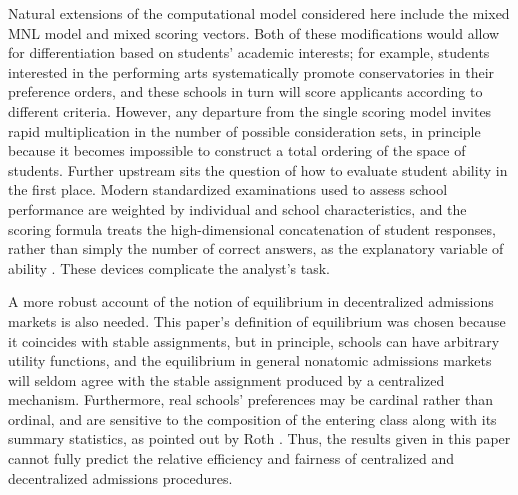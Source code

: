 \documentclass[12pt]{article}
\theoremstyle{definition}
\begin{document}
Natural extensions of the computational model considered here include the mixed MNL model and mixed scoring vectors. Both of these modifications would allow for differentiation based on students' academic interests; for example, students interested in the performing arts systematically promote conservatories in their preference orders, and these schools in turn will score applicants according to different criteria. However, any departure from the single scoring model invites rapid multiplication in the number of possible consideration sets, in principle because it becomes impossible to construct a total ordering of the space of students. Further upstream sits the question of how to evaluate student ability in the first place. Modern standardized examinations used to assess school performance are weighted by individual and school characteristics, and the scoring formula treats the high-dimensional concatenation of student responses, rather than simply the number of correct answers, as the explanatory variable of ability \parencite[][]{measurementofstudentability}. These devices complicate the analyst's task.

A more robust account of the notion of equilibrium in decentralized admissions markets is also needed. This paper's definition of equilibrium was chosen because it coincides with stable assignments, but in principle, schools can have arbitrary utility functions, and the equilibrium in general nonatomic admissions markets will seldom agree with the stable assignment produced by a centralized mechanism. Furthermore, real schools' preferences may be cardinal rather than ordinal, and are sensitive to the composition of the entering class along with its summary statistics, as pointed out by Roth \parencite*{collegeadmissionsisnotmarriage}. Thus, the results given in this paper cannot fully predict the relative efficiency and fairness of centralized and decentralized admissions procedures. 
\end{document}
